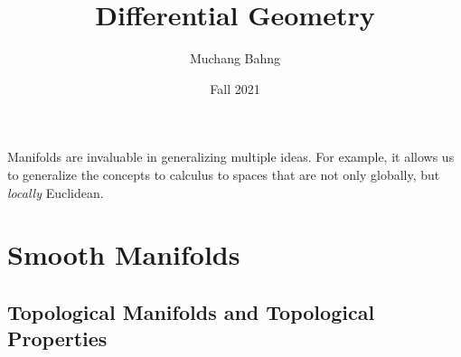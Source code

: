 \documentclass{article}
\newcounter{example}[section]
\begin{document}
\title{Differential Geometry}
\author{Muchang Bahng}
\date{Fall 2021}

\maketitle
\tableofcontents
\pagebreak

Manifolds are invaluable in generalizing multiple ideas. For example, it allows us to generalize the concepts to calculus to spaces that are not only globally, but \textit{locally} Euclidean. 

\section{Smooth Manifolds}

  \subsection{Topological Manifolds and Topological Properties}
\end{document}
